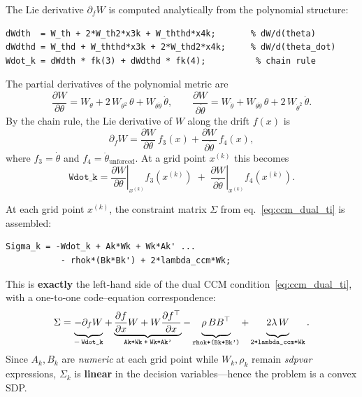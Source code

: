 \documentclass[11pt,a4paper]{article}
\begin{document}
The Lie derivative \(\partial_f W\) is computed analytically from the polynomial structure:

\begin{lstlisting}
dWdth  = W_th + 2*W_th2*x3k + W_ththd*x4k;       % dW/d(theta)
dWdthd = W_thd + W_ththd*x3k + 2*W_thd2*x4k;     % dW/d(theta_dot)
Wdot_k = dWdth * fk(3) + dWdthd * fk(4);          % chain rule
\end{lstlisting}

\begin{codemath}
The partial derivatives of the polynomial metric are
\[
\frac{\partial W}{\partial \theta}
=
W_\theta + 2\,W_{\theta^2}\,\theta + W_{\theta\dot\theta}\,\dot\theta,
\qquad
\frac{\partial W}{\partial \dot\theta}
=
W_{\dot\theta} + W_{\theta\dot\theta}\,\theta + 2\,W_{\dot\theta^2}\,\dot\theta.
\]
By the chain rule, the Lie derivative of \(W\) along the drift \(f(x)\) is
\[
\partial_f W
=
\frac{\partial W}{\partial \theta}\,f_3(x)
+
\frac{\partial W}{\partial \dot\theta}\,f_4(x),
\]
where \(f_3 = \dot\theta\) and \(f_4 = \ddot\theta_{\text{unforced}}\). At a grid point \(x^{(k)}\) this becomes
\[
\texttt{Wdot\_k}
=
\left.\frac{\partial W}{\partial \theta}\right|_{x^{(k)}}\! f_3(x^{(k)})
\;+\;
\left.\frac{\partial W}{\partial \dot\theta}\right|_{x^{(k)}}\! f_4(x^{(k)}).
\]
\end{codemath}

At each grid point \(x^{(k)}\), the constraint matrix \(\Sigma\) from eq.~\eqref{eq:ccm_dual_ti} is assembled:

\begin{lstlisting}
Sigma_k = -Wdot_k + Ak*Wk + Wk*Ak' ...
           - rhok*(Bk*Bk') + 2*lambda_ccm*Wk;
\end{lstlisting}

\begin{codemath}
This is \textbf{exactly} the left-hand side of the dual CCM condition~\eqref{eq:ccm_dual_ti}, with a one-to-one code--equation correspondence:
\[
\Sigma
= \underbrace{-\partial_f W\vphantom{\frac{\partial f}{\partial x}}}_{-\,\texttt{Wdot\_k}}
+ \underbrace{\frac{\partial f}{\partial x}W + W\frac{\partial f^\top}{\partial x}}_{\texttt{Ak*Wk\;+\;Wk*Ak'}}
- \underbrace{\rho\, B B^\top\vphantom{\frac{\partial f}{\partial x}}}_{\texttt{rhok*(Bk*Bk')}}
+ \underbrace{2\lambda\, W\vphantom{\frac{\partial f}{\partial x}}}_{\texttt{2*lambda\_ccm*Wk}}.
\]
Since \(A_k, B_k\) are \emph{numeric} at each grid point while \(W_k, \rho_k\) remain \emph{sdpvar} expressions, \(\Sigma_k\) is \textbf{linear} in the decision variables---hence the problem is a convex SDP.
\end{codemath}
\end{document}
